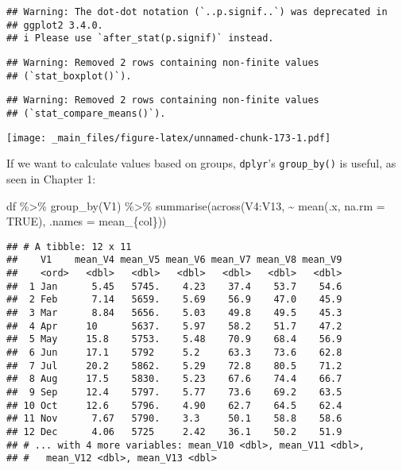 \documentclass[
]{book}
\newenvironment{Shaded}{\begin{snugshade}}{\end{snugshade}}
\newcommand{\AttributeTok}[1]{\textcolor[rgb]{0.77,0.63,0.00}{#1}}
\newcommand{\ConstantTok}[1]{\textcolor[rgb]{0.00,0.00,0.00}{#1}}
\newcommand{\FunctionTok}[1]{\textcolor[rgb]{0.00,0.00,0.00}{#1}}
\newcommand{\NormalTok}[1]{#1}
\newcommand{\SpecialCharTok}[1]{\textcolor[rgb]{0.00,0.00,0.00}{#1}}
\newcommand{\StringTok}[1]{\textcolor[rgb]{0.31,0.60,0.02}{#1}}
\begin{document}
\begin{verbatim}
## Warning: The dot-dot notation (`..p.signif..`) was deprecated in
## ggplot2 3.4.0.
## i Please use `after_stat(p.signif)` instead.
\end{verbatim}

\begin{verbatim}
## Warning: Removed 2 rows containing non-finite values
## (`stat_boxplot()`).
\end{verbatim}

\begin{verbatim}
## Warning: Removed 2 rows containing non-finite values
## (`stat_compare_means()`).
\end{verbatim}

\texttt{[image: \_main\_files/figure-latex/unnamed-chunk-173-1.pdf]}

If we want to calculate values based on groups, \texttt{dplyr}'s \texttt{group\_by()} is useful, as seen in Chapter 1:

\begin{Shaded}
\begin{Highlighting}[]
\NormalTok{df }\SpecialCharTok{\%\textgreater{}\%} \FunctionTok{group\_by}\NormalTok{(V1) }\SpecialCharTok{\%\textgreater{}\%}
  \FunctionTok{summarise}\NormalTok{(}\FunctionTok{across}\NormalTok{(V4}\SpecialCharTok{:}\NormalTok{V13, }\SpecialCharTok{\textasciitilde{}} \FunctionTok{mean}\NormalTok{(.x, }\AttributeTok{na.rm =} \ConstantTok{TRUE}\NormalTok{), }
                   \AttributeTok{.names =} \StringTok{\textquotesingle{}mean\_\{col\}\textquotesingle{}}\NormalTok{))}
\end{Highlighting}
\end{Shaded}

\begin{verbatim}
## # A tibble: 12 x 11
##    V1    mean_V4 mean_V5 mean_V6 mean_V7 mean_V8 mean_V9
##    <ord>   <dbl>   <dbl>   <dbl>   <dbl>   <dbl>   <dbl>
##  1 Jan      5.45   5745.    4.23    37.4    53.7    54.6
##  2 Feb      7.14   5659.    5.69    56.9    47.0    45.9
##  3 Mar      8.84   5656.    5.03    49.8    49.5    45.3
##  4 Apr     10      5637.    5.97    58.2    51.7    47.2
##  5 May     15.8    5753.    5.48    70.9    68.4    56.9
##  6 Jun     17.1    5792     5.2     63.3    73.6    62.8
##  7 Jul     20.2    5862.    5.29    72.8    80.5    71.2
##  8 Aug     17.5    5830.    5.23    67.6    74.4    66.7
##  9 Sep     12.4    5797.    5.77    73.6    69.2    63.5
## 10 Oct     12.6    5796.    4.90    62.7    64.5    62.4
## 11 Nov      7.67   5790.    3.3     50.1    58.8    58.6
## 12 Dec      4.06   5725     2.42    36.1    50.2    51.9
## # ... with 4 more variables: mean_V10 <dbl>, mean_V11 <dbl>,
## #   mean_V12 <dbl>, mean_V13 <dbl>
\end{verbatim}
\end{document}
